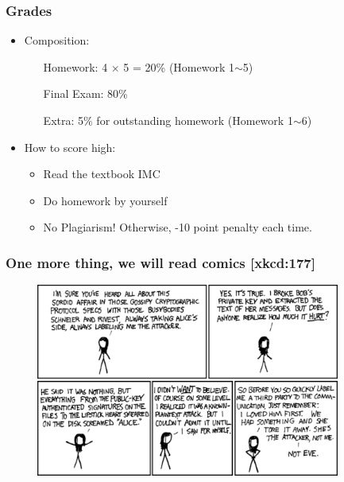 \begin{frame}\frametitle{Grades}
\begin{itemize}
\item Composition:
\begin{itemize}
\item[Homework:] 4 $\times$ 5 = 20\% (Homework 1$\sim$5)
\item[Final Exam:] 80\%
\item[Extra:]  5\% for outstanding homework (Homework 1$\sim$6)
\end{itemize}
\item How to score high:
\begin{itemize}
\item Read the textbook IMC
\item Do homework by yourself
\item \alert{No Plagiarism! Otherwise, -10 point penalty each time.} 
\end{itemize}
\end{itemize}
\end{frame}
\begin{frame}\frametitle{One more thing, we will read comics  [xkcd:177]}
\begin{figure}
\begin{center}
\includegraphics[width=100mm]{pic/term} 
\end{center}
\end{figure}
\end{frame}
